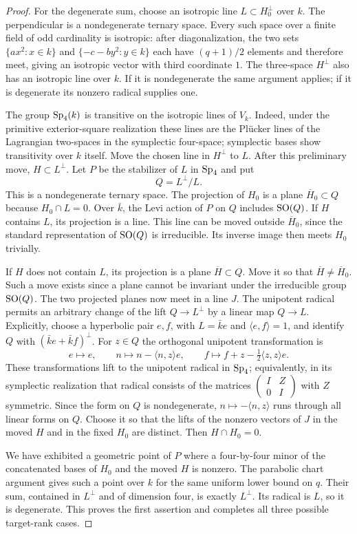 \begin{proof}
For the degenerate sum, choose an isotropic line $L\subset H_0^\perp$
over $k$.  The perpendicular is a nondegenerate ternary space.  Every
such space over a finite field of odd cardinality is isotropic: after
diagonalization, the two sets
$\{ax^2:x\in k\}$ and $\{-c-by^2:y\in k\}$ each have
$(q+1)/2$ elements and therefore meet, giving an isotropic vector with
third coordinate $1$.  The three-space $H^\perp$ also has an isotropic
line over $k$.  If it is nondegenerate the same argument applies; if
it is degenerate its nonzero radical supplies one.

The group $\operatorname{Sp}_4(k)$ is transitive on the isotropic lines of $V_k$.
Indeed, under the primitive exterior-square realization these lines are
the Pl\"ucker lines of the Lagrangian two-spaces in the symplectic
four-space; symplectic bases show transitivity over $k$ itself.
Move the chosen line in $H^\perp$ to $L$.  After this preliminary
move, $H\subset L^\perp$.  Let $P$ be the stabilizer of $L$ in
$\operatorname{Sp}_4$ and put
\[
 Q=L^\perp/L.
\]
This is a nondegenerate ternary space.  The projection of $H_0$ is
a plane $\overline H_0\subset Q$ because $H_0\cap L=0$.
Over $\bar k$, the Levi action of $P$ on $Q$ includes $\operatorname{SO}(Q)$.
If $H$ contains $L$, its projection is a line.  This line can be
moved outside $\overline H_0$, since the standard representation of
$\operatorname{SO}(Q)$ is irreducible.  Its inverse image then meets $H_0$ trivially.

If $H$ does not contain $L$, its projection is a plane
$\overline H\subset Q$.  Move it so that
$\overline H\ne\overline H_0$.  Such a move exists since a plane
cannot be invariant under the irreducible group $\operatorname{SO}(Q)$.  The two
projected planes now meet in a line $J$.  The unipotent radical permits
an arbitrary change of the lift $Q\longrightarrow L^\perp$ by a
linear map $Q\longrightarrow L$.  Explicitly, choose a hyperbolic
pair $e,f$, with $L=\bar k e$ and $\langle e,f\rangle=1$, and
identify $Q$ with $(\bar k e+\bar k f)^\perp$.  For $z\in Q$ the
orthogonal unipotent transformation is
\[
 e\longmapsto e,\qquad
 n\longmapsto n-\langle n,z\rangle e,\qquad
 f\longmapsto f+z-\tfrac12\langle z,z\rangle e.
\]
These transformations lift to the unipotent radical in $\operatorname{Sp}_4$;
equivalently, in its symplectic realization that radical consists of
the matrices $\left(\begin{smallmatrix}I&Z\\0&I\end{smallmatrix}\right)$
with $Z$ symmetric.  Since the form on $Q$ is nondegenerate,
$n\mapsto-\langle n,z\rangle$ runs through all linear forms on
$Q$.  Choose it so that the lifts of the nonzero vectors of $J$ in
the moved $H$ and in the fixed $H_0$ are distinct.  Then
$H\cap H_0=0$.

We have exhibited a geometric point of $P$ where a four-by-four
minor of the concatenated bases of $H_0$ and the moved $H$ is
nonzero.  The parabolic chart argument gives such a point over $k$
for the same uniform lower bound on $q$.  Their sum, contained in
$L^\perp$ and of dimension four, is exactly $L^\perp$.  Its radical
is $L$, so it is degenerate.  This proves the first assertion and
completes all three possible target-rank cases.
\end{proof}

